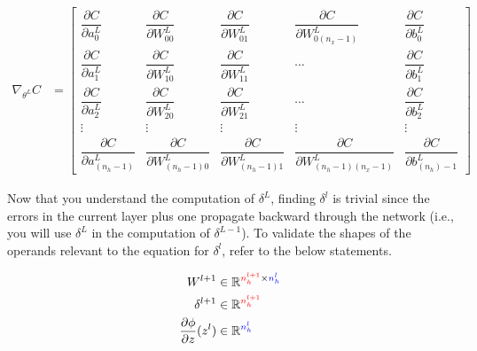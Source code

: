 \documentclass{article}
\newcommand{\colorvar}[2]{
	\begingroup\color{#1}{#2}\endgroup
}
\begin{document}
\begin{align}
	\nabla_{\theta^{L}} C & =
	\begin{bmatrix}
		\dfrac{\partial C}{\partial a_{0}^{L}}           & \dfrac{\partial C}{\partial W_{00}^{L}}           & \dfrac{\partial C}{\partial W_{01}^{L}}         & \dfrac{\partial C}{\partial W_{0(n_{x}-1)}^{L}}         & \dfrac{\partial C}{\partial b_{0}^{L}}         \\
		\dfrac{\partial C}{\partial a_{1}^{L}}           & \dfrac{\partial C}{\partial W_{10}^{L}}           & \dfrac{\partial C}{\partial W_{11}^{L}}         & \cdots                                                  & \dfrac{\partial C}{\partial b_{1}^{L}}         \\
		\dfrac{\partial C}{\partial a_{2}^{L}}           & \dfrac{\partial C}{\partial W_{20}^{L}}           & \dfrac{\partial C}{\partial W_{21}^{L}}         & \cdots                                                  & \dfrac{\partial C}{\partial b_{2}^{L}}         \\
		\vdots                                           & \vdots                                            & \vdots                                          & \vdots                                                  & \vdots                                         \\
		\dfrac{\partial C}{\partial a_{(n_{h} - 1)}^{L}} & \dfrac{\partial C}{\partial W_{(n_{h} - 1)0}^{L}} & \dfrac{\partial C}{\partial W_{(n_{h}-1)1}^{L}} & \dfrac{\partial C}{\partial W_{(n_{h}-1)(n_{x}-1)}^{L}} & \dfrac{\partial C}{\partial b_{(n_{h})-1}^{L}}
	\end{bmatrix}
\end{align}

Now that you understand the computation of $\delta^{L}$, finding $\delta^{l}$
is trivial since the errors in the current layer plus one propagate backward through
the network (i.e., you will use $\delta^{L}$ in the computation of $\delta^{L-1}$).
To validate the shapes of the operands relevant to the equation for $\delta^{l}$,
refer to the below statements.

\begin{align}
	W^{l+1}                                 & \in \mathbb{R}^{\colorvar{red}{n_h^{l+1}} \times \colorvar{blue}{n_{h}^{l}}} \\
	\delta^{l+1}                            & \in \mathbb{R}^{\colorvar{red}{n_h^{l+1}}}                                   \\
	\frac{\partial \phi}{\partial z}(z^{l}) & \in \mathbb{R}^{\colorvar{blue}{n_{h}^{l}}}
\end{align}
\end{document}
